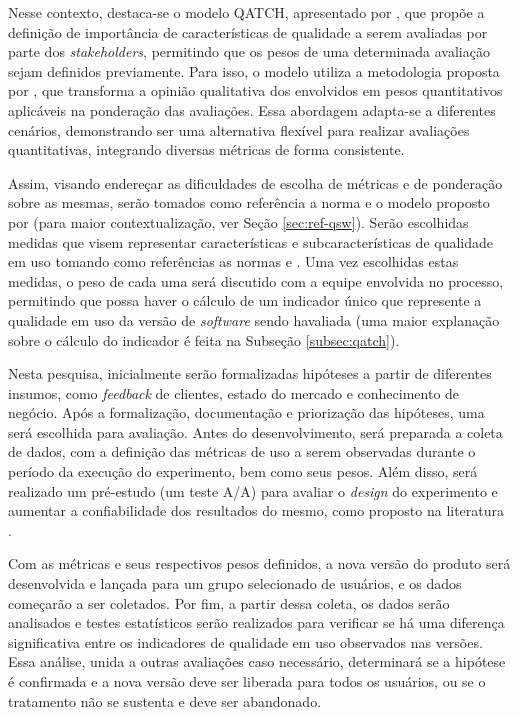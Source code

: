 Nesse contexto, destaca-se o modelo QATCH, apresentado por , que propõe a definição de importância de características de qualidade a serem avaliadas por parte dos \textit{stakeholders}, permitindo que os pesos de uma determinada avaliação sejam definidos previamente. Para isso, o modelo utiliza a metodologia proposta por , que transforma a opinião qualitativa dos envolvidos em pesos quantitativos aplicáveis na ponderação das avaliações. Essa abordagem adapta-se a diferentes cenários, demonstrando ser uma alternativa flexível para realizar avaliações quantitativas, integrando diversas métricas de forma consistente.

Assim, visando endereçar as dificuldades de escolha de métricas e de ponderação sobre as mesmas, serão tomados como referência a norma  e o modelo proposto por  (para maior contextualização, ver Seção \ref{sec:ref-qsw}). Serão escolhidas medidas que visem representar características e subcaracterísticas de qualidade em uso tomando como referências as normas  e . Uma vez escolhidas estas medidas, o peso de cada uma será discutido com a equipe envolvida no processo, permitindo que possa haver o cálculo de um indicador único que represente a qualidade em uso da versão de \textit{software} sendo havaliada (uma maior explanação sobre o cálculo do indicador é feita na Subseção \ref{subsec:qatch}).

Nesta pesquisa, inicialmente serão formalizadas hipóteses a partir de diferentes insumos, como \textit{feedback} de clientes, estado do mercado e conhecimento de negócio. Após a formalização, documentação e priorização das hipóteses, uma será escolhida para avaliação. Antes do desenvolvimento, será preparada a coleta de dados, com a definição das métricas de uso a serem observadas durante o período da execução do experimento, bem como seus pesos. Além disso, será realizado um pré-estudo (um teste A/A) para avaliar o \textit{design} do experimento e aumentar a confiabilidade dos resultados do mesmo, como proposto na literatura \cite{fabijan_evolution_2017, fabijan_three_2019, erthal_characterization_2023, fabijan_benefits_2017, crook_seven_2009}.

Com as métricas e seus respectivos pesos definidos, a nova versão do produto será desenvolvida e lançada para um grupo selecionado de usuários, e os dados começarão a ser coletados. Por fim, a partir dessa coleta, os dados serão analisados e testes estatísticos serão realizados para verificar se há uma diferença significativa entre os indicadores de qualidade em uso observados nas versões. Essa análise, unida a outras avaliações caso necessário, determinará se a hipótese é confirmada e a nova versão deve ser liberada para todos os usuários, ou se o tratamento não se sustenta e deve ser abandonado.


